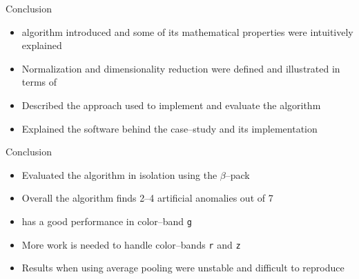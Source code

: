 \begin{frame}{Conclusion}
    \begin{itemize}
        \item \mlblink algorithm introduced and some of its mathematical properties were intuitively explained
        \item Normalization and dimensionality reduction were defined and illustrated in terms of \mlblink
        \item Described the approach used to implement and evaluate the \mlblink algorithm
        \item Explained the software behind the case--study and its implementation
    \end{itemize}
\end{frame}

\begin{frame}{Conclusion}
    \begin{itemize}
        \item Evaluated the \mlblink algorithm in isolation using the $\beta$--pack
        \item Overall the \mlblink algorithm finds 2--4 artificial anomalies out of 7
        \item \mlblink has a good performance in \panstarrs color--band \texttt{g}
        \item More work is needed to handle \panstarrs color--bands \texttt{r} and \texttt{z}
        \item Results when using average pooling were unstable and difficult to reproduce
    \end{itemize}
\end{frame}